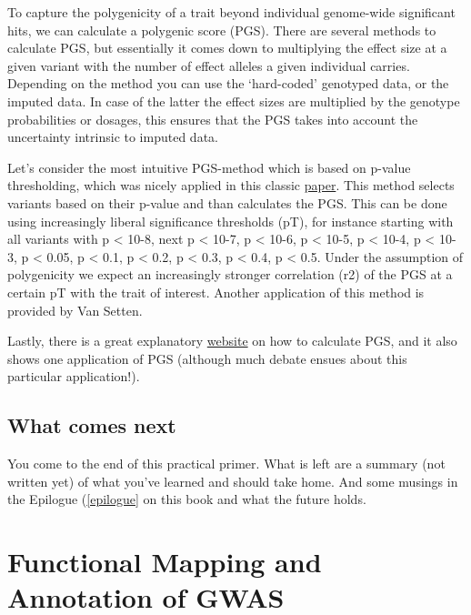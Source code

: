 \documentclass[
]{book}
\begin{document}
To capture the polygenicity of a trait beyond individual genome-wide significant hits, we can calculate a polygenic score (PGS). There are several methods to calculate PGS, but essentially it comes down to multiplying the effect size at a given variant with the number of effect alleles a given individual carries.
Depending on the method you can use the `hard-coded' genotyped data, or the imputed data. In case of the latter the effect sizes are multiplied by the genotype probabilities or dosages, this ensures that the PGS takes into account the uncertainty intrinsic to imputed data.

Let's consider the most intuitive PGS-method which is based on p-value thresholding, which was nicely applied in this classic \href{https://doi.org/10.1038/nature08185}{paper}. This method selects variants based on their p-value and than calculates the PGS. This can be done using increasingly liberal significance thresholds (pT), for instance starting with all variants with p \textless{} 10-8, next p \textless{} 10-7, p \textless{} 10-6, p \textless{} 10-5, p \textless{} 10-4, p \textless{} 10-3, p \textless{} 0.05, p \textless{} 0.1, p \textless{} 0.2, p \textless{} 0.3, p \textless{} 0.4, p \textless{} 0.5. Under the assumption of polygenicity we expect an increasingly stronger correlation (r2) of the PGS at a certain pT with the trait of interest. Another application of this method is provided by Van Setten\citep{vansetten2015}.

Lastly, there is a great explanatory \href{http://polygenicscores.org/explained/}{website} on how to calculate PGS, and it also shows one application of PGS (although much debate ensues about this particular application!).

\hypertarget{what-comes-next}{%
\section{What comes next}\label{what-comes-next}}

You come to the end of this practical primer. What is left are a summary (not written yet) of what you've learned and should take home. And some musings in the Epilogue (\ref{epilogue} on this book and what the future holds.

\hypertarget{fuma}{%
\chapter{Functional Mapping and Annotation of GWAS}\label{fuma}}
\end{document}
